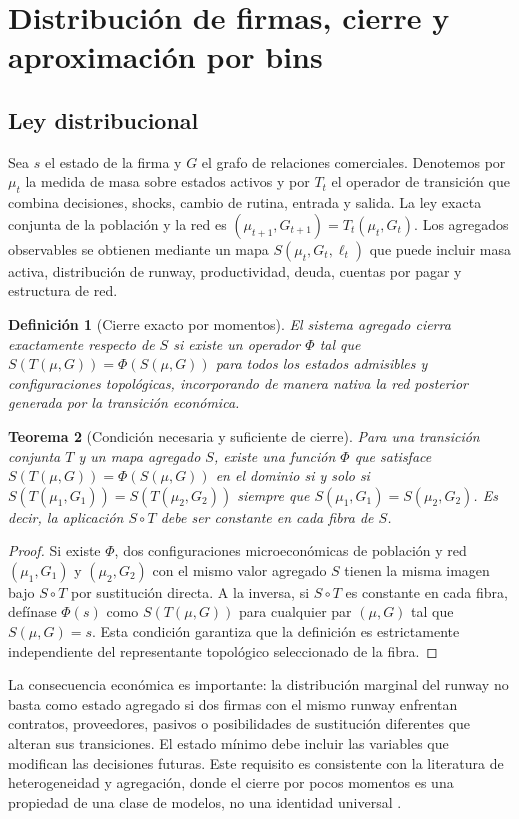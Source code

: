 \documentclass[11pt,a4paper]{article}
\newtheorem{theorem}{Teorema}[section]
\newtheorem{definition}[theorem]{Definición}
\begin{document}
\section{Distribución de firmas, cierre y aproximación por bins}
\subsection{Ley distribucional}
Sea $s$ el estado de la firma y $G$ el grafo de relaciones comerciales. Denotemos por $\mu_t$ la medida de masa sobre estados activos y por $T_t$ el operador de transición que combina decisiones, shocks, cambio de rutina, entrada y salida. La ley exacta conjunta de la población y la red es $(\mu_{t+1}, G_{t+1}) = T_t(\mu_t, G_t)$. Los agregados observables se obtienen mediante un mapa $S(\mu_t,G_t,\ell_t)$ que puede incluir masa activa, distribución de runway, productividad, deuda, cuentas por pagar y estructura de red.

\begin{definition}[Cierre exacto por momentos]
El sistema agregado cierra exactamente respecto de $S$ si existe un operador $\Phi$ tal que $S(T(\mu, G)) = \Phi(S(\mu, G))$ para todos los estados admisibles y configuraciones topológicas, incorporando de manera nativa la red posterior generada por la transición económica.
\end{definition}

\begin{theorem}[Condición necesaria y suficiente de cierre]
Para una transición conjunta $T$ y un mapa agregado $S$, existe una función $\Phi$ que satisface $S(T(\mu, G)) = \Phi(S(\mu, G))$ en el dominio si y solo si $S(T(\mu_1, G_1)) = S(T(\mu_2, G_2))$ siempre que $S(\mu_1, G_1) = S(\mu_2, G_2)$. Es decir, la aplicación $S \circ T$ debe ser constante en cada fibra de $S$.
\end{theorem}
\begin{proof}
Si existe $\Phi$, dos configuraciones microeconómicas de población y red $(\mu_1, G_1)$ y $(\mu_2, G_2)$ con el mismo valor agregado $S$ tienen la misma imagen bajo $S \circ T$ por sustitución directa. A la inversa, si $S \circ T$ es constante en cada fibra, defínase $\Phi(s)$ como $S(T(\mu, G))$ para cualquier par $(\mu, G)$ tal que $S(\mu, G) = s$. Esta condición garantiza que la definición es estrictamente independiente del representante topológico seleccionado de la fibra.
\end{proof}

La consecuencia económica es importante: la distribución marginal del runway no basta como estado agregado si dos firmas con el mismo runway enfrentan contratos, proveedores, pasivos o posibilidades de sustitución diferentes que alteran sus transiciones. El estado mínimo debe incluir las variables que modifican las decisiones futuras. Este requisito es consistente con la literatura de heterogeneidad y agregación, donde el cierre por pocos momentos es una propiedad de una clase de modelos, no una identidad universal \citep{krusell1998,achdou2022}.
\end{document}

